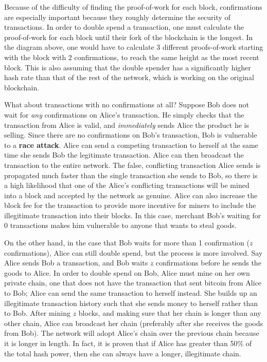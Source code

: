 \documentclass[11pt]{article}
\begin{document}
  Because of the difficulty of finding the proof-of-work for each block, confirmations are especially important because they roughly determine the security of transactions. In order to double spend a transaction, one must calculate the proof-of-work for each block until their fork of the blockchain is the longest. In the diagram above, one would have to calculate 3 different proofs-of-work starting with the block with 2 confirmations, to reach the same height as the most recent block. This is also assuming that the double spender has a significantly higher hash rate than that of the rest of the network, which is working on the original blockchain.
  
  What about transactions with no confirmations at all? Suppose Bob does not wait for \textit{any} confirmations on Alice's transaction. He simply checks that the transaction from Alice is valid, and \textit{immediately} sends Alice the product he is selling. Since there are no confirmations on Bob's transaction, Bob is vulnerable to a \textbf{race attack}. Alice can send a competing transaction to herself at the same time she sends Bob the legitimate transaction. Alice can then broadcast the transaction to the entire network. The false, conflicting transaction Alice sends is propagated much faster than the single transaction she sends to Bob, so there is a high likelihood that one of the Alice's conflicting transactions will be mined into a block and accepted by the network as genuine. Alice can also increase the block fee for the transaction to provide more incentive for miners to include the illegitimate transaction into their blocks. In this case, merchant Bob's waiting for 0 transactions makes him vulnerable to anyone that wants to steal goods. 
  
  On the other hand, in the case that Bob waits for more than 1 confirmation ($z$ confirmations), Alice can still double spend, but the process is more involved. Say Alice sends Bob a transaction, and Bob waits $z$ confirmations before he sends the goods to Alice. In order to double spend on Bob, Alice must mine on her own private chain, one that does not have the transaction that sent bitcoin from Alice to Bob; Alice can send the same transaction to herself instead. She builds up an illegitimate transaction history such that she sends money to herself rather than to Bob. After mining $z$ blocks, and making sure that her chain is longer than any other chain, Alice can broadcast her chain (preferably after she receives the goods from Bob). The network will adopt Alice's chain over the previous chain because it is longer in length. In fact, it is proven that if Alice has greater than 50\% of the total hash power, then she can always have a longer, illegitimate chain. \\ \\
 
\end{document}
